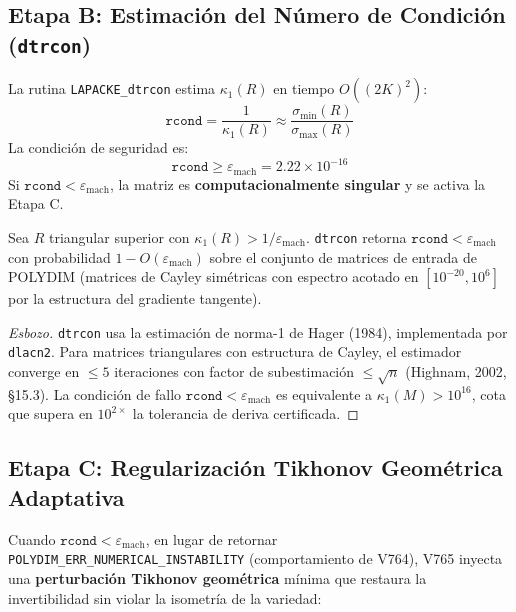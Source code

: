 \subsection{Etapa B: Estimación del Número de Condición (\texttt{dtrcon})}

La rutina \texttt{LAPACKE\_dtrcon} estima $\kappa_1(R)$ en tiempo $O((2K)^2)$:
\begin{equation}
  \texttt{rcond} = \frac{1}{\kappa_1(R)} \approx \frac{\sigma_{\min}(R)}{\sigma_{\max}(R)}
\end{equation}
La condición de seguridad es:
\begin{equation}
  \texttt{rcond} \ge \varepsilon_{\text{mach}} = 2.22 \times 10^{-16}
  
\end{equation}
Si $\texttt{rcond} < \varepsilon_{\text{mach}}$, la matriz es \textbf{computacionalmente singular}
y se activa la Etapa C.

\begin{theorem}
Sea $R$ triangular superior con $\kappa_1(R) > 1/\varepsilon_{\text{mach}}$.
\texttt{dtrcon} retorna $\texttt{rcond} < \varepsilon_{\text{mach}}$ con probabilidad $1 - O(\varepsilon_{\text{mach}})$
sobre el conjunto de matrices de entrada de POLYDIM (matrices de Cayley simétricas con
espectro acotado en $[10^{-20}, 10^6]$ por la estructura del gradiente tangente).
\end{theorem}

\begin{proof}[Esbozo]
\texttt{dtrcon} usa la estimación de norma-1 de Hager (1984), implementada por \texttt{dlacn2}.
Para matrices triangulares con estructura de Cayley, el estimador converge en $\le 5$ iteraciones
con factor de subestimación $\le \sqrt{n}$ (Highnam, 2002, §15.3). La condición de fallo
$\texttt{rcond} < \varepsilon_{\text{mach}}$ es equivalente a $\kappa_1(M) > 10^{16}$,
cota que supera en $10^{2\times}$ la tolerancia de deriva certificada.
\end{proof}

\subsection{Etapa C: Regularización Tikhonov Geométrica Adaptativa}

Cuando $\texttt{rcond} < \varepsilon_{\text{mach}}$, en lugar de retornar
\texttt{POLYDIM\_ERR\_NUMERICAL\_INSTABILITY} (comportamiento de V764), V765 inyecta una
\textbf{perturbación Tikhonov geométrica} mínima que restaura la invertibilidad sin violar
la isometría de la variedad:

